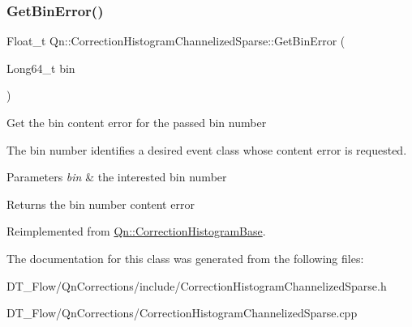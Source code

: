 \subsubsection{\texorpdfstring{Get\+Bin\+Error()}{GetBinError()}}
{\footnotesize\ttfamily Float\+\_\+t Qn\+::\+Correction\+Histogram\+Channelized\+Sparse\+::\+Get\+Bin\+Error (\begin{DoxyParamCaption}\item[{Long64\+\_\+t}]{bin }\end{DoxyParamCaption})\hspace{0.3cm}{\ttfamily [virtual]}}

Get the bin content error for the passed bin number

The bin number identifies a desired event class whose content error is requested.


\begin{DoxyParams}{Parameters}
{\em bin} & the interested bin number \\
\hline
\end{DoxyParams}
\begin{DoxyReturn}{Returns}
the bin number content error 
\end{DoxyReturn}


Reimplemented from \mbox{\hyperlink{classQn_1_1CorrectionHistogramBase_a50a7dd4c5bbe5e4d0e405365c2a9104d}{Qn\+::\+Correction\+Histogram\+Base}}.



The documentation for this class was generated from the following files\+:\begin{DoxyCompactItemize}
\item 
D\+T\+\_\+\+Flow/\+Qn\+Corrections/include/Correction\+Histogram\+Channelized\+Sparse.\+h\item 
D\+T\+\_\+\+Flow/\+Qn\+Corrections/Correction\+Histogram\+Channelized\+Sparse.\+cpp\end{DoxyCompactItemize}
